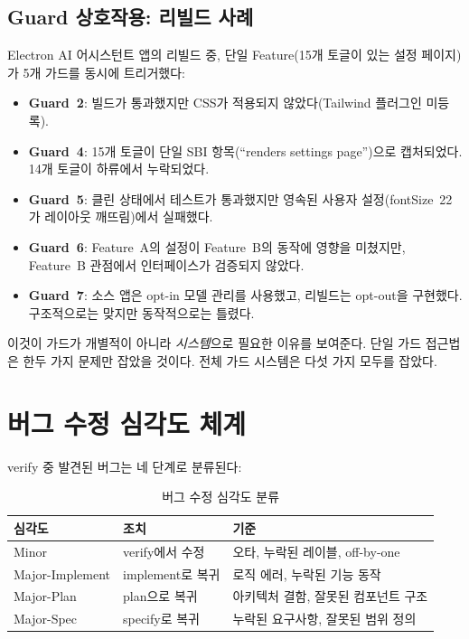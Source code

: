 \documentclass[11pt,a4paper,openright,twoside]{report}
\begin{document}
\subsection{Guard 상호작용: 리빌드 사례}

Electron AI 어시스턴트 앱의 리빌드 중, 단일 Feature(15개 토글이 있는 설정 페이지)가 5개 가드를 동시에 트리거했다:

\begin{itemize}
  \item \textbf{Guard~2}: 빌드가 통과했지만 CSS가 적용되지 않았다(Tailwind 플러그인 미등록).
  \item \textbf{Guard~4}: 15개 토글이 단일 SBI 항목(``renders settings page'')으로 캡처되었다. 14개 토글이 하류에서 누락되었다.
  \item \textbf{Guard~5}: 클린 상태에서 테스트가 통과했지만 영속된 사용자 설정(fontSize~22가 레이아웃 깨뜨림)에서 실패했다.
  \item \textbf{Guard~6}: Feature~A의 설정이 Feature~B의 동작에 영향을 미쳤지만, Feature~B 관점에서 인터페이스가 검증되지 않았다.
  \item \textbf{Guard~7}: 소스 앱은 opt-in 모델 관리를 사용했고, 리빌드는 opt-out을 구현했다. 구조적으로는 맞지만 동작적으로는 틀렸다.
\end{itemize}

이것이 가드가 개별적이 아니라 \emph{시스템}으로 필요한 이유를 보여준다. 단일 가드 접근법은 한두 가지 문제만 잡았을 것이다. 전체 가드 시스템은 다섯 가지 모두를 잡았다.

\section{버그 수정 심각도 체계}

verify 중 발견된 버그는 네 단계로 분류된다:

\begin{table}[H]
\centering
\caption{버그 수정 심각도 분류}
\label{tab:severity}
\begin{tabularx}{\textwidth}{llX}
\toprule
\textbf{심각도} & \textbf{조치} & \textbf{기준} \\
\midrule
Minor & verify에서 수정 & 오타, 누락된 레이블, off-by-one \\
Major-Implement & implement로 복귀 & 로직 에러, 누락된 기능 동작 \\
Major-Plan & plan으로 복귀 & 아키텍처 결함, 잘못된 컴포넌트 구조 \\
Major-Spec & specify로 복귀 & 누락된 요구사항, 잘못된 범위 정의 \\
\bottomrule
\end{tabularx}
\end{table}
\end{document}
